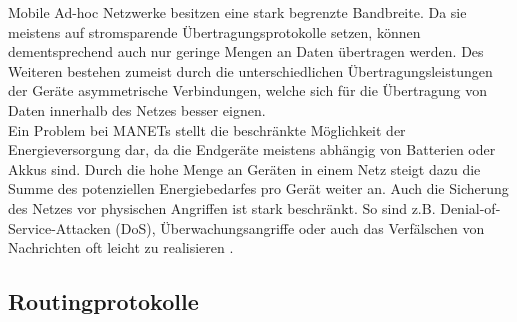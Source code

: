 Mobile Ad-hoc Netzwerke besitzen eine stark begrenzte Bandbreite. Da sie meistens auf stromsparende Übertragungsprotokolle setzen, können dementsprechend auch nur geringe Mengen an Daten übertragen werden. Des Weiteren bestehen zumeist durch die unterschiedlichen Übertragungsleistungen der Geräte asymmetrische Verbindungen, welche sich für die Übertragung von Daten innerhalb des Netzes besser eignen.\\

Ein Problem bei MANETs stellt die beschränkte Möglichkeit der Energieversorgung dar, da die Endgeräte meistens abhängig von Batterien oder Akkus sind. Durch die hohe Menge an Geräten in einem Netz steigt dazu die Summe des potenziellen Energiebedarfes pro Gerät weiter an. Auch die Sicherung des Netzes vor physischen Angriffen ist stark beschränkt. So sind z.B. Denial-of-Service-Attacken (DoS), Überwachungsangriffe oder auch das Verfälschen von Nachrichten oft leicht zu realisieren \cite{d:timm}.

\subsection{Routingprotokolle}\label{ss:Routingprotokolle}